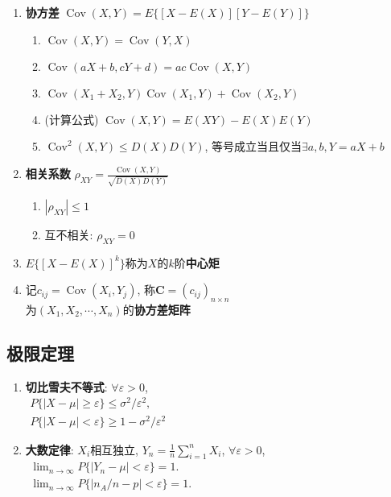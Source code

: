 \documentclass[10pt,a4paper,nofonts]{ctexart}
\newcommand{\D}{\displaystyle}
\DeclareMathOperator{\Cov}{Cov}
\begin{document}
\begin{multicols}{2}
\begin{enumerate}
\item {\bf 协方差} $\Cov(X,Y)=E\{[X-E(X)][Y-E(Y)]\}$
\begin{enumerate}[label={\sf 性质\arabic*}]
\item $\Cov(X,Y)=\Cov(Y,X)$
\item $\Cov(aX+b,cY+d)=ac\Cov(X,Y)$
\item $\Cov(X_1+X_2,Y)\Cov(X_1,Y)+\Cov(X_2,Y)$
\item (计算公式) $\Cov(X,Y)=E(XY)-E(X)E(Y)$
\item $\Cov^2(X,Y)\le D(X)D(Y)$, 等号成立当且仅当$\exists a,b, Y=aX+b$
\end{enumerate}

\item {\bf 相关系数} $\rho_{XY}=\D\frac{\Cov(X,Y)}{\sqrt{D(X)D(Y)}}$
\begin{enumerate}
\item $|\rho_{XY}|\le 1$
\item 互不相关: $\rho_{XY}=0$
\end{enumerate}

\item $E\{[X-E(X)]^k\}$称为$X$的$k$阶{\bf 中心矩}
\item 记$c_{ij}=\Cov(X_i,Y_j)$, 称$\bm C =(c_{ij})_{n\times n}$\\为$(X_1,X_2,\cdots,X_n)$的{\bf 协方差矩阵}

\end{enumerate}

\subsection{极限定理}

\begin{enumerate}

\item {\bf 切比雪夫不等式}: $\forall \varepsilon>0$,\\
$\begin{array}{l}
P\{|X-\mu|\ge\varepsilon\}\le\sigma^2/\varepsilon^2,\\
P\{|X-\mu|<\varepsilon\}\ge1-\sigma^2/\varepsilon^2
\end{array}$

\item {\bf 大数定律}: $X_i$相互独立, $Y_n=\frac{1}{n}\sum_{i=1}^{n}X_i$, $\forall \varepsilon>0$,\\
$\begin{array}{l}
\lim_{n\to\infty}P\{|Y_n-\mu|<\varepsilon\}=1.\\
\lim_{n\to\infty}P\{|n_A/n-p|<\varepsilon\}=1.
\end{array}$


\end{enumerate}
\end{multicols}
\end{document}
